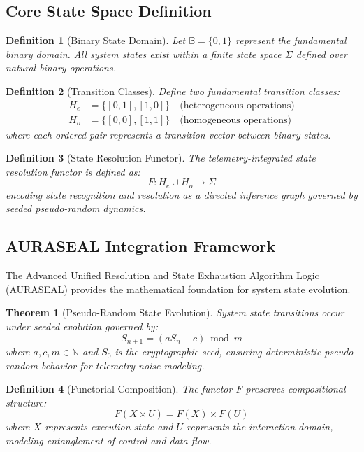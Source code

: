 \documentclass[12pt,a4paper]{article}
\newtheorem{theorem}{Theorem}
\newtheorem{definition}{Definition}
\begin{document}
\subsection{Core State Space Definition}

\begin{definition}[Binary State Domain]
Let $\mathbb{B} = \{0,1\}$ represent the fundamental binary domain. All system states exist within a finite state space $\Sigma$ defined over natural binary operations.
\end{definition}

\begin{definition}[Transition Classes]
Define two fundamental transition classes:
\begin{align}
H_e &= \{[0,1], [1,0]\} \quad \text{(heterogeneous operations)} \\
H_o &= \{[0,0], [1,1]\} \quad \text{(homogeneous operations)}
\end{align}
where each ordered pair represents a transition vector between binary states.
\end{definition}

\begin{definition}[State Resolution Functor]
The telemetry-integrated state resolution functor is defined as:
\[F : H_e \cup H_o \to \Sigma\]
encoding state recognition and resolution as a directed inference graph governed by seeded pseudo-random dynamics.
\end{definition}

\subsection{AURASEAL Integration Framework}

The Advanced Unified Resolution and State Exhaustion Algorithm Logic (AURASEAL) provides the mathematical foundation for system state evolution.

\begin{theorem}[Pseudo-Random State Evolution]
System state transitions occur under seeded evolution governed by:
\[S_{n+1} = (aS_n + c) \bmod m\]
where $a, c, m \in \mathbb{N}$ and $S_0$ is the cryptographic seed, ensuring deterministic pseudo-random behavior for telemetry noise modeling.
\end{theorem}

\begin{definition}[Functorial Composition]
The functor $F$ preserves compositional structure:
\[F(X \times U) = F(X) \times F(U)\]
where $X$ represents execution state and $U$ represents the interaction domain, modeling entanglement of control and data flow.
\end{definition}
\end{document}
